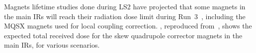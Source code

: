 Magnets lifetime studies done during LS\num{2} have projected that some magnets in the main IRs will reach their radiation dose limit during Run~\num{3}~\cite{PRES:Cerutti:TripletLifetime_Evian}, including the MQSX magnets used for local coupling correction.
, reproduced from~\cite{PRES:Cerutti:TripletLifetime_Evian}, shows the expected total received dose for the skew quadrupole corrector magnets in the main IRs, for various scenarios.

